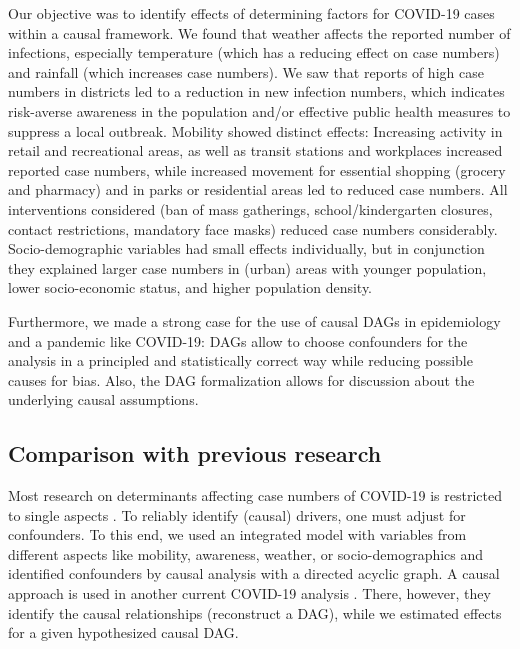 \documentclass[10pt,letterpaper]{article}
\begin{document}
Our objective was to identify effects of determining factors for COVID-19 cases within a causal framework. We found that weather affects the reported number of infections, especially temperature (which has a reducing effect on case numbers) and rainfall (which increases case numbers). We saw that reports of high case numbers in districts led to a reduction in new infection numbers, which indicates risk-averse awareness in the population and/or effective public health measures to suppress a local outbreak. Mobility showed distinct effects: Increasing activity in retail and recreational areas, as well as transit stations and workplaces increased reported case numbers, while increased movement for essential shopping (grocery and pharmacy) and in parks or residential areas led to reduced case numbers. All interventions considered (ban of mass gatherings, school/kindergarten closures, contact restrictions, mandatory face masks) reduced case numbers considerably. Socio-demographic variables had small effects individually, but in conjunction they explained larger case numbers in (urban) areas with younger population, lower socio-economic status, and higher population density.

Furthermore, we made a strong case for the use of causal DAGs in epidemiology and a pandemic like COVID-19: DAGs allow to choose confounders for the analysis in a principled and statistically correct way while reducing possible causes for bias. Also, the DAG formalization allows for discussion about the underlying causal assumptions.

\subsection*{Comparison with previous
research}\label{comparison-with-previous-research}

Most research on determinants affecting case numbers of COVID-19 is restricted to single aspects \cite{fowler_effect_2020, li_retrospective_2020, shi_impact_2020, Wang2020temperature}. To reliably identify (causal) drivers, one must adjust for confounders. To this end, we used an integrated model with variables from different aspects like mobility, awareness, weather, or socio-demographics and identified confounders by causal analysis with a directed acyclic graph. A causal approach is used in another current COVID-19 analysis \cite{gencoglu2020causal}. There, however, they identify the causal relationships (reconstruct a DAG), while we estimated effects for a given hypothesized causal DAG.
\end{document}
